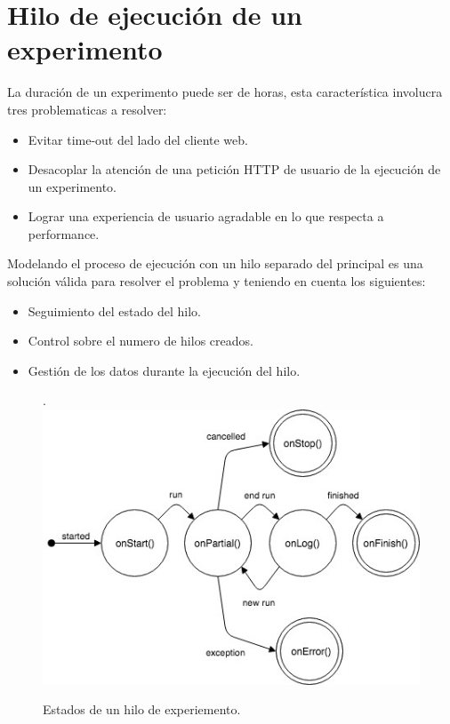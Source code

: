\section{Hilo de ejecuci\'on de un experimento}

La duraci\'on de un experimento puede ser de horas, esta caracter\'istica involucra tres problematicas
a resolver:

\begin{itemize}
    \item Evitar time-out del lado del cliente web.
    \item Desacoplar la atenci\'on de una petici\'on HTTP de usuario de la ejecuci\'on de un experimento.
    \item Lograr una experiencia de usuario agradable en lo que respecta a performance.
\end{itemize}

Modelando el proceso de ejecuci\'on con un hilo separado del principal es una soluci\'on
v\'alida para resolver el problema y teniendo en cuenta los siguientes:

\begin{itemize}
    \item Seguimiento del estado del hilo.
    \item Control sobre el numero de hilos creados.
    \item Gesti\'on de los datos durante la ejecuci\'on del hilo.
\end{itemize}

\begin{figure}[!htb].
    \includegraphics[width=\linewidth]{../figures/d14.jpg}
    \caption{Estados de un hilo de experiemento.}
    \label{fig:d14}
\end{figure}

\newpage